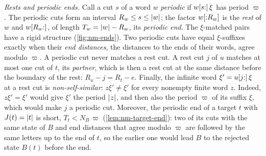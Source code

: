 \emph{Rests and periodic ends.} Call a cut $s$ of a word $w$ \emph{periodic}
if $w[s{:}]\,\xi$ has period $\varpi$. The periodic cuts form an interval
$R_w\le s\le\lvert w\rvert$; the factor $w[{:}R_w]$ is the \emph{rest} of $w$
and $w[R_w{:}]$, of length $T_w=\lvert w\rvert-R_w$, its \emph{periodic
end}. The $\xi$-matched pairs have a rigid structure (\cref{fig:nm-ends}). Two
periodic cuts have equal $\xi$-suffixes exactly when their \emph{end
distances}, the distances to the ends of their words, agree modulo $\varpi$. A
periodic cut never matches a rest cut. A rest cut $j$ of $u$ matches at most one cut of $t$, its
\emph{partner}, which is then a rest cut at the same distance before the
boundary of the rest: $R_u-j=R_t-e$. Finally, the infinite word
$\xi'=u[j{:}]\,\xi$ at a rest cut is \emph{non-self-similar}: $z\xi'\ne\xi'$ for every
nonempty finite word $z$. Indeed, $z\xi'=\xi'$ would give $\xi'$ the period $\lvert z\rvert$,
and then also the period $\varpi$ of its suffix $\xi$, which would make $j$ a
periodic cut. Moreover, the periodic end of a target $t$ with $J(t)=\lvert t\rvert$ is
short, $T_t<N_B\,\varpi$ (\cref{lem:nm-target-end}): two of its cuts with the same
state of $B$ and end distances that agree modulo $\varpi$ are followed by the
same letters up to the end of $t$, so the earlier one would lead $B$ to the rejected state
$B(t)$ before the end.

